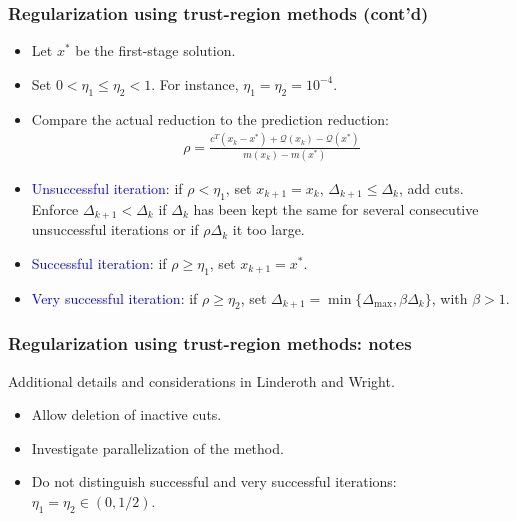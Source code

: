 \documentclass{beamer}
\def\cQ{\mathcal{Q}}
\begin{document}
\begin{frame}
\frametitle{Regularization using trust-region methods (cont'd)}

\begin{itemize}
	\item 
Let $x^*$ be the first-stage solution.
\item
Set $0 < \eta_1 \leq \eta_2 < 1$. For instance, $\eta_1 = \eta_2 = 10^{-4}$.
\item
Compare the actual reduction to the prediction reduction:
\begin{align*}
	\rho = \frac{c^T(x_k-x^*)+\cQ(x_k)-\cQ(x^*)}{m(x_k)-m(x^*)}
\end{align*}
\item
\textcolor{blue}{Unsuccessful iteration}: if $\rho < \eta_1$, set $x_{k+1} = x_k$, $\Delta_{k+1} \leq \Delta_k$, add cuts.
Enforce $\Delta_{k+1} < \Delta_k$ if $\Delta_k$ has been kept the same for several consecutive unsuccessful iterations or if $\rho \Delta_k$ it too large.
\item
\textcolor{blue}{Successful iteration}: if $\rho \geq \eta_1$, set $x_{k+1} = x^*$.
\item
\textcolor{blue}{Very successful iteration}: if $\rho \geq \eta_2$, set $\Delta_{k+1} = \min \{ \Delta_{\max}, \beta \Delta_k \}$, with $\beta > 1$.
\end{itemize}

\end{frame}

\begin{frame}
\frametitle{Regularization using trust-region methods: notes}

Additional details and considerations in Linderoth and Wright.
\begin{itemize}
\item
Allow deletion of inactive cuts.
\item
Investigate parallelization of the method.
\item
Do not distinguish successful and very successful iterations: $\eta_1 = \eta_2 \in (0, 1/2)$.
\end{itemize}

\end{frame}
\end{document}
